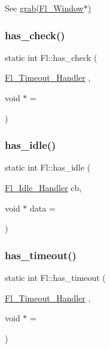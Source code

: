 See \hyperlink{group__fl__windows_gaff9d012f19ac1d15214847bbabd5a890}{grab(\+Fl\+\_\+\+Window$\ast$)} \mbox{\label{class_fl_ab95c139129a7dc9c4c385d50d96acc9c}} 
\subsubsection{\texorpdfstring{has\+\_\+check()}{has\_check()}}
{\footnotesize\ttfamily static int Fl\+::has\+\_\+check (\begin{DoxyParamCaption}\item[{\hyperlink{group__callback__functions_ga17b5c6570394124287997166a50ff07a}{Fl\+\_\+\+Timeout\+\_\+\+Handler}}]{,  }\item[{void $\ast$}]{ = {} }\end{DoxyParamCaption})\hspace{0.3cm}{\ttfamily [static]}}

\mbox{\label{class_fl_a8cddcd87aac46548a94419cb46eecbb1}} 
\subsubsection{\texorpdfstring{has\+\_\+idle()}{has\_idle()}}
{\footnotesize\ttfamily static int Fl\+::has\+\_\+idle (\begin{DoxyParamCaption}\item[{\hyperlink{group__callback__functions_gac9d2aab1d3142308450e2da09716013e}{Fl\+\_\+\+Idle\+\_\+\+Handler}}]{cb,  }\item[{void $\ast$}]{data = {} }\end{DoxyParamCaption})\hspace{0.3cm}{\ttfamily [static]}}

\mbox{\label{class_fl_a326546095b08b36db3834cd90b250bdc}} 
\subsubsection{\texorpdfstring{has\+\_\+timeout()}{has\_timeout()}}
{\footnotesize\ttfamily static int Fl\+::has\+\_\+timeout (\begin{DoxyParamCaption}\item[{\hyperlink{group__callback__functions_ga17b5c6570394124287997166a50ff07a}{Fl\+\_\+\+Timeout\+\_\+\+Handler}}]{,  }\item[{void $\ast$}]{ = {} }\end{DoxyParamCaption})\hspace{0.3cm}{\ttfamily [static]}}


